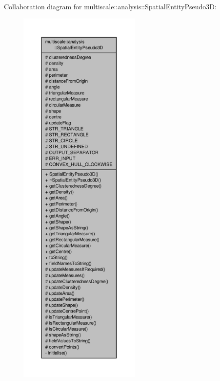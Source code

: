 Collaboration diagram for multiscale\-:\-:analysis\-:\-:Spatial\-Entity\-Pseudo3\-D\-:
\nopagebreak
\begin{figure}[H]
\begin{center}
\leavevmode
\includegraphics[height=550pt]{classmultiscale_1_1analysis_1_1SpatialEntityPseudo3D__coll__graph}
\end{center}
\end{figure}
